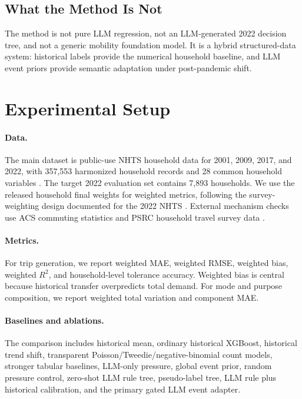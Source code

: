 \documentclass[11pt]{article}
\newcommand{\nhts}{\textsc{NHTS}}
\begin{document}
\subsection{What the Method Is Not}

The method is not pure LLM regression, not an LLM-generated 2022 decision tree, and not a generic mobility foundation model.
It is a hybrid structured-data system: historical labels provide the numerical household baseline, and LLM event priors provide semantic adaptation under post-pandemic shift.

\section{Experimental Setup}

\paragraph{Data.}
The main dataset is public-use \nhts{} household data for 2001, 2009, 2017, and 2022, with 357,553 harmonized household records and 28 common household variables \citep{fhwa2022nhts,fhwa2024nhtstrends}.
The target 2022 evaluation set contains 7,893 households.
We use the released household final weights for weighted metrics, following the survey-weighting design documented for the 2022 \nhts{} \citep{ipsos2022nhtsweighting}.
External mechanism checks use ACS commuting statistics and PSRC household travel survey data \citep{burrows2024commuting,psrc2024regionaltravelstudy}.

\paragraph{Metrics.}
For trip generation, we report weighted MAE, weighted RMSE, weighted bias, weighted $R^2$, and household-level tolerance accuracy.
Weighted bias is central because historical transfer overpredicts total demand.
For mode and purpose composition, we report weighted total variation and component MAE.

\paragraph{Baselines and ablations.}
The comparison includes historical mean, ordinary historical XGBoost, historical trend shift, transparent Poisson/Tweedie/negative-binomial count models, stronger tabular baselines, LLM-only pressure, global event prior, random pressure control, zero-shot LLM rule tree, pseudo-label tree, LLM rule plus historical calibration, and the primary gated LLM event adapter.
\end{document}
